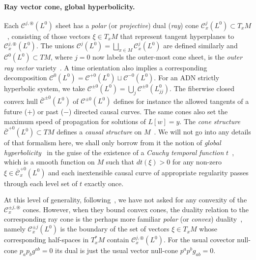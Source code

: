 \documentclass[a4paper]{article}
\theoremstyle{remark}
\newcommand{\oast}{\circledast} %
\begin{document}
\paragraph{Ray vector cone, global hyperbolicity.}
Each $\mathcal{C}^{j,\oast}(L^0)$ sheet has a \emph{polar} (or
\emph{projective}) dual (\emph{ray}) cone $\mathcal{C}_x^j(L^0) \subset
T_xM$~\cite{wiki-projective-dual}, consisting of those vectors $\xi \in T_xM$
that represent tangent hyperplanes to $\mathcal{C}_x^{j,\oast}(L^0)$. The unions
$\mathcal{C}^{j}(L^0) = \bigsqcup_{x\in M} \mathcal{C}_x^{j}(L^0)$ are defined
similarly and $\mathcal{C}^{0}(L^0) \subset TM$, where $j=0$ now labels the
outer-most cone sheet, is the \emph{outer ray vector}
variety~\cite[Def.16]{kh-chargeom}. A time orientation also implies a
corresponding decomposition $\mathcal{C}^0(L^0) = \mathcal{C}^{+0}(L^0) \sqcup
\mathcal{C}^{-0}(L^0)$. For an ADN strictly hyperbolic system, we take
$\mathcal{C}^{\pm0}(L^0) = \bigcup_j \mathcal{C}^{\pm0}(L^0_{jj})$. The
fiberwise closed convex hull $\bar{\mathcal{C}}^{\pm0}(L^0)$ of
$\mathcal{C}^{\pm0}(L^0)$ defines
for instance the allowed
tangents of a future ($+$) or past ($-$) directed causal curves. The same cones
also set the maximum speed of propagation for solutions of $L[w]= y$. The
\emph{cone structure} $\bar{\mathcal{C}}^{+0}(L^0) \subset TM$ defines a
\emph{causal structure} on $M$~\cite{minguzzi}. We will not go into any details
of that formalism here, we shall only borrow from it the notion of \emph{global
hyperbolicity}~\cite[Def.2.20]{minguzzi} in the guise of the existence of a
\emph{Cauchy temporal function} $t$~\cite[Thm.2.45]{minguzzi}, which is a
smooth function on $M$ such that $dt(\xi) > 0$ for any non-zero $\xi \in
\bar{\mathcal{C}}_x^{+0}(L^0)$ and each inextensible causal curve of
appropriate regularity passes through each level set of $t$ exactly once.

At this level of generality, following~\cite{gv-mixed}, we have not asked for
any convexity of the $\mathcal{C}_x^{\pm j,\oast}$ cones. However, when they
bound convex cones, the duality relation to the corresponding ray cone is the
perhaps more familiar \emph{polar} (or \emph{convex})
duality~\cite[Def.15]{kh-chargeom}, namely $\mathcal{C}_x^{\pm j}(L^0)$ is the
boundary of the set of vectors $\xi \in T_xM$ whose corresponding half-spaces
in $T_x^*M$ contain $\mathcal{C}_x^{j,\oast}(L^0)$. For the usual covector
null-cone $p_a p_b g^{ab} = 0$ its dual is just the usual vector null-cone
$p^a p^b g_{ab} = 0$.
\end{document}
